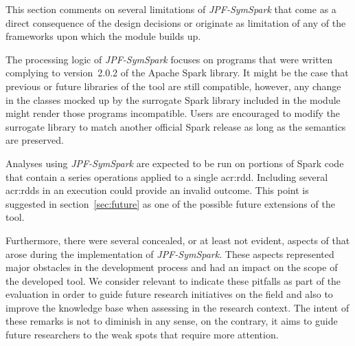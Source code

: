 \label{sec:limitations}

%
%
%
%
%

This section comments on several limitations of \textit{JPF-SymSpark} that come as a direct consequence of the design decisions or originate as limitation of any of the frameworks upon which the module builds up.

The processing logic of \textit{JPF-SymSpark} focuses on programs that were written complying to version~2.0.2 of the Apache Spark library. It might be the case that previous or future libraries of the tool are still compatible, however, any change in the classes mocked up by the surrogate Spark library included in the module might render those programs incompatible. Users are encouraged to modify the surrogate library to match another official Spark release as long as the semantics are preserved.

Analyses using \textit{JPF-SymSpark} are expected to be run on portions of Spark code that contain a series operations applied to a single \acrshort{acr:rdd}. Including several \acrshort{acr:rdd}s in an execution could provide an invalid outcome. This point is suggested in section~\ref{sec:future} as one of the possible future extensions of the tool.

Furthermore, there were several concealed, or at least not evident, aspects of \spf{} that arose during the implementation of \textit{JPF-SymSpark}. These aspects represented major obstacles in the development process and had an impact on the scope of the developed tool. We consider relevant to indicate these pitfalls as part of the evaluation in order to guide future research initiatives on the field and also to improve the knowledge base when assessing \spf{} in the research context. The intent of these remarks is not to diminish \spf{} in any sense, on the contrary, it aims to guide future researchers to the weak spots that require more attention.

